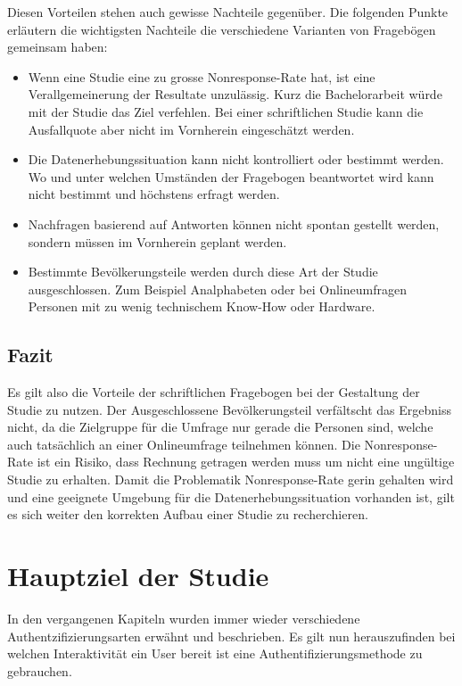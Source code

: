 Diesen Vorteilen stehen auch gewisse Nachteile gegenüber. Die folgenden
Punkte erläutern die wichtigsten Nachteile die verschiedene Varianten
von Fragebögen gemeinsam haben:

\begin{itemize}
\tightlist
\item
  Wenn eine Studie eine zu grosse Nonresponse-Rate hat, ist eine
  Verallgemeinerung der Resultate unzulässig. Kurz die Bachelorarbeit
  würde mit der Studie das Ziel verfehlen. Bei einer schriftlichen
  Studie kann die Ausfallquote aber nicht im Vornherein eingeschätzt
  werden.
\item
  Die Datenerhebungssituation kann nicht kontrolliert oder bestimmt
  werden. Wo und unter welchen Umständen der Fragebogen beantwortet wird
  kann nicht bestimmt und höchstens erfragt werden.
\item
  Nachfragen basierend auf Antworten können nicht spontan gestellt
  werden, sondern müssen im Vornherein geplant werden.
\item
  Bestimmte Bevölkerungsteile werden durch diese Art der Studie
  ausgeschlossen. Zum Beispiel Analphabeten oder bei Onlineumfragen
  Personen mit zu wenig technischem Know-How oder Hardware.
\end{itemize}

\subsection{Fazit}\label{fazit-1}

Es gilt also die Vorteile der schriftlichen Fragebogen bei der
Gestaltung der Studie zu nutzen. Der Ausgeschlossene Bevölkerungsteil
verfältscht das Ergebniss nicht, da die Zielgruppe für die Umfrage nur
gerade die Personen sind, welche auch tatsächlich an einer Onlineumfrage
teilnehmen können. Die Nonresponse-Rate ist ein Risiko, dass Rechnung
getragen werden muss um nicht eine ungültige Studie zu erhalten. Damit
die Problematik Nonresponse-Rate gerin gehalten wird und eine geeignete
Umgebung für die Datenerhebungssituation vorhanden ist, gilt es sich
weiter den korrekten Aufbau einer Studie zu recherchieren.

\newpage

\section{Hauptziel der Studie}\label{hauptziel-der-studie}

In den vergangenen Kapiteln wurden immer wieder verschiedene
Authentzifizierungsarten erwähnt und beschrieben. Es gilt nun
herauszufinden bei welchen Interaktivität ein User bereit ist eine
Authentifizierungsmethode zu gebrauchen.

